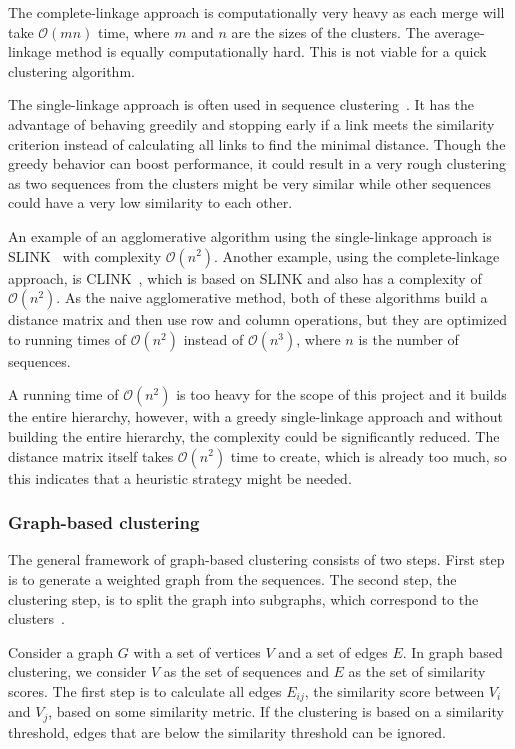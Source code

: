The complete-linkage approach is computationally very heavy as each merge will
take $\mathcal{O}(mn)$ time, where $m$ and $n$ are the sizes of the clusters.
The average-linkage method is equally computationally hard. This is not viable
for a quick clustering algorithm.

The single-linkage approach is often used in sequence
clustering~\cite[pp.~62--63]{dong}. It has the advantage of behaving greedily
and stopping early if a link meets the similarity criterion instead of
calculating all links to find the minimal distance. Though the greedy behavior
can boost performance, it could result in a very rough clustering as two
sequences from the clusters might be very similar while other sequences could
have a very low similarity to each other.

An example of an agglomerative algorithm using the single-linkage approach is
SLINK~\cite{sibson} with complexity $\mathcal{O}\left(n^2\right)$. Another
example, using the complete-linkage approach, is CLINK~\cite{defays}, which is
based on SLINK and also has a complexity of $\mathcal{O}\left(n^2\right)$. As
the naive agglomerative method, both of these algorithms build a distance
matrix and then use row and column operations, but they are optimized to
running times of $\mathcal{O}\left(n^2\right)$ instead of
$\mathcal{O}\left(n^3\right)$, where $n$ is the number of sequences.

A running time of $\mathcal{O}\left(n^2\right)$ is too heavy for the scope of
this project and it builds the entire hierarchy, however, with a greedy
single-linkage approach and without building the entire hierarchy, the
complexity could be significantly reduced. The distance matrix itself takes
$\mathcal{O}\left(n^2\right)$ time to create, which is already too much, so
this indicates that a heuristic strategy might be needed.


\subsubsection{Graph-based clustering}

The general framework of graph-based clustering consists of two steps. First
step is to generate a weighted graph from the sequences. The second step, the
clustering step, is to split the graph into subgraphs, which correspond to the
clusters~\cite[pp. 64-65]{dong}.

Consider a graph $G$ with a set of vertices $V$ and a set of edges $E$. In
graph based clustering, we consider $V$ as the set of sequences and $E$ as the
set of similarity scores. The first step is to calculate all edges $E_{ij}$,
the similarity score between $V_i$ and $V_j$, based on some similarity metric.
If the clustering is based on a similarity threshold, edges that are below the
similarity threshold can be ignored.

